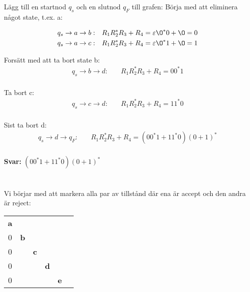 \documentclass{article}
\begin{document}
\section{}
Lägg till en startnod $q_s$ och en slutnod $q_F$ till grafen: 
Börja med att eliminera något state, t.ex. a:

\begin{align*}
q_s \to a \to b: & \quad R_1R_2^*R_3+R_4 = \varepsilon\O^*0+\O = 0 \\
q_s \to a \to c: & \quad R_1R_2^*R_3+R_4 = \varepsilon\O^*1+\O = 1
\end{align*}

Forsätt med att ta bort state b:
\begin{align*}
q_s \to b \to d: & \quad R_1R_2^*R_3+R_4 = 00^*1 \\
\end{align*}

Ta bort c:
\begin{align*}
q_s \to c \to d: & \quad R_1R_2^*R_3+R_4 = 11^*0 \\
\end{align*}

Sist ta bort d:
\begin{align*}
q_s \to d \to q_F: & \quad R_1R_2^*R_3+R_4 = (00^*1+11^*0)(0+1)^* \\
\end{align*}


\textbf{Svar: } $(00^*1+11^*0)(0+1)^*$

\section{}

Vi börjar med att markera alla par av tillstånd där ena är accept och den andra är reject:

\begin{center}
\begin{tabular}{|*{6}{c|}}
                             \cline{1-1}
  \textbf{a}              \\ \cline{1-2}
  0 & \textbf{b}          \\ \cline{1-3}
  0 &  & \textbf{c}       \\ \cline{1-4}
  0 &  &  & \textbf{d}    \\ \cline{1-5}
  0 &  &  &  & \textbf{e} \\ \cline{1-5}
\end{tabular}
\end{center}
\end{document}

